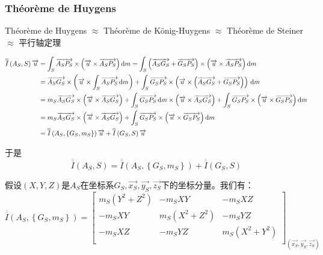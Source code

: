 \documentclass[UTF8]{ctexart}%
\begin{document}
\subsubsection{Théorème de Huygens}
\label{sec:ThéorèmeDeHuygens}
Théorème de Huygens $\approx$ Théorème de König-Huygens $\approx$ Théorème de Steiner $\approx$ 平行轴定理

\begin{align}
\overline{\overline{I}}\left( A_S,S \right) \overrightarrow{u}&=\int_S{\overrightarrow{A_SP_S}\times \left( \overrightarrow{u}\times \overrightarrow{A_SP_S} \right)}\,\mathrm{d}m=\int_S{\left( \overrightarrow{A_SG_S}+\overrightarrow{G_SP_S} \right) \times \left( \overrightarrow{u}\times \overrightarrow{A_SP_S} \right)}\,\mathrm{d}m\notag \\
&=\overrightarrow{A_SG_S}\times \left( \overrightarrow{u}\times \int_S{\overrightarrow{A_SP_S}}\,\mathrm{d}m \right) +\int_S{\overrightarrow{G_SP_S}}\times \left( \overrightarrow{u}\times \left( \overrightarrow{A_SG_S}+\overrightarrow{G_SP_S} \right) \right)\,\mathrm{d}m\notag \\
&=m_S\overrightarrow{A_SG_S}\times \left( \overrightarrow{u}\times \overrightarrow{A_SG_S} \right) +\int_S{\overrightarrow{G_SP_S}\,\mathrm{d}m\times \left( \overrightarrow{u}\times \overrightarrow{A_SG_S} \right)}+\int_S{\overrightarrow{G_SP_S}\times \left( \overrightarrow{u}\times \overrightarrow{G_SP_S} \right)}\,\mathrm{d}m\notag \\
&=m_S\overrightarrow{A_SG_S}\times \left( \overrightarrow{u}\times \overrightarrow{A_SG_S} \right) +\int_S{\overrightarrow{G_SP_S}\times \left( \overrightarrow{u}\times \overrightarrow{G_SP_S} \right)}\,\mathrm{d}m\notag \\
&=\overline{\overline{I}}\left( A_S,\left\{ G_S,m_S \right\} \right) \overrightarrow{u}+\overline{\overline{I}}\left( G_S,S \right) \overrightarrow{u}
\end{align}

于是
\begin{equation}
\overline{\overline{I}}\left( A_S,S \right) =\overline{\overline{I}}\left( A_S,\left\{ G_S,m_S \right\} \right) +\overline{\overline{I}}\left( G_S,S \right) 
\end{equation}

假设$(X,Y,Z)$是$A_S$在坐标系$G_S,\overrightarrow{x_S},\overrightarrow{y_S},\overrightarrow{z_S}$下的坐标分量。我们有：
\begin{equation}
\overline{\overline{I}}\left( A_S,\left\{ G_S,m_S \right\} \right) =\left[ \begin{matrix}
	m_S\left( Y^2+Z^2 \right)&		-m_SXY&		-m_SXZ\\
	-m_SXY&		m_S\left( X^2+Z^2 \right)&		-m_SYZ\\
	-m_SXZ&		-m_SYZ&		m_S\left( X^2+Y^2 \right)\\
\end{matrix} \right] _{\left( \overrightarrow{x_S},\overrightarrow{y_S},\overrightarrow{z_S} \right)}
\end{equation}
\end{document}
